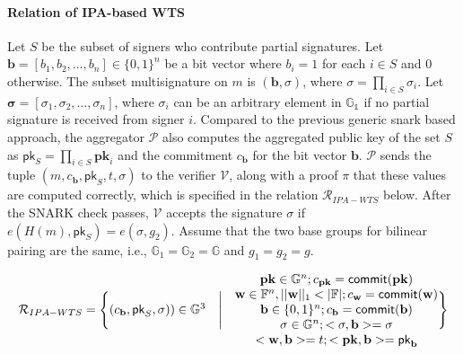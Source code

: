 \paragraph{Relation of IPA-based WTS} Let $S$ be the subset of signers who contribute partial signatures. Let $\mathbf{b}=[b_1,b_2,\dots, b_n]\in \{0,1\}^n$ be a bit vector where $b_i=1$ for each $i\in S$ and 0 otherwise. The subset multisignature on $m$ is $(\mathbf{b}, \sigma)$, where $\sigma = \prod_{i\in S}\sigma_i$. Let $\mathbf{\sigma}=[\sigma_1,\sigma_2,\dots, \sigma_n]$, where $\sigma_i$ can be an arbitrary element in $\mathbb{G_1}$ if no partial signature is received from signer $i$. Compared to the previous generic snark based approach, the aggregator $\mathcal{P}$ also computes the aggregated public key of the set $S$ as $\mathsf{pk}_S = \prod_{i\in S}\mathbf{pk}_i$ and the commitment $c_{\mathbf{b}}$ for the bit vector $\mathbf{b}$.  $\mathcal{P}$ sends the tuple $(m, c_{\mathbf{b}}, \mathsf{pk}_S, t, \sigma)$ to the verifier $\mathcal{V}$, along with a proof $\pi$ that these values are computed correctly, which is specified in the relation $\mathcal{R}_{IPA-WTS}$ below. After the SNARK check passes, $\mathcal{V}$ accepts the signature $\sigma$ if $e(H(m), \mathsf{pk}_S)  = e(\sigma, g_2)$. Assume that the two base groups for bilinear pairing are the same, i.e., $\mathbb{G}_1=\mathbb{G}_2 = \mathbb{G}$ and $g_1=g_2=g$. 

\begin{equation*}
    \mathcal{R}_{IPA-WTS} = 
\Bigg\{\space \begin{matrix}
         (c_{\mathbf{b}}, \mathsf{pk}_S, \sigma))\in \mathbb{G}^3\\
    \end{matrix}\quad \Bigg| \quad \begin{matrix}
        \mathbf{pk}\in \mathbb{G}^n; c_{\mathbf{pk}} = \mathsf{commit}(\mathbf{pk})\\
        \mathbf{w}\in \mathbb{F}^n, ||\mathbf{w}||_1<|\mathbb{F}|;  c_{\mathbf{w}} = \mathsf{commit}(\mathbf{w})\\
        \mathbf{b} \in \{0,1\}^n; c_{\mathbf{b}} = \mathsf{commit}(\mathbf{b}) \\
        \mathbf{\sigma}\in \mathbb{G}^n; <\mathbf{\sigma}, \mathbf{b}>=\sigma\\
        <\mathbf{w}, \mathbf{b}> = t; <\mathbf{pk}, \mathbf{b}>=\mathsf{pk}_{\mathbf{b}}\\
    \end{matrix}\space \Bigg\}
\end{equation*}

